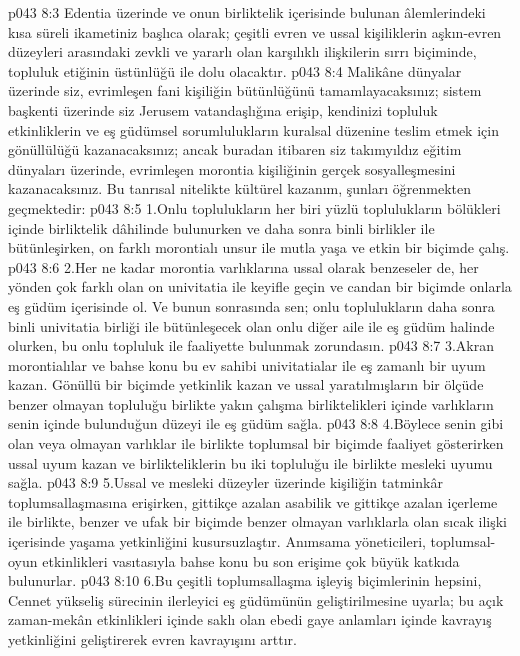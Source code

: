 \vs p043 8:3 Edentia üzerinde ve onun birliktelik içerisinde bulunan âlemlerindeki kısa süreli ikametiniz başlıca olarak; çeşitli evren ve ussal kişiliklerin aşkın\hyp{}evren düzeyleri arasındaki zevkli ve yararlı olan karşılıklı ilişkilerin sırrı biçiminde, topluluk etiğinin üstünlüğü ile dolu olacaktır.
\vs p043 8:4 Malikâne dünyalar üzerinde siz, evrimleşen fani kişiliğin bütünlüğünü tamamlayacaksınız; sistem başkenti üzerinde siz Jerusem vatandaşlığına erişip, kendinizi topluluk etkinliklerin ve eş güdümsel sorumlulukların kuralsal düzenine teslim etmek için gönüllülüğü kazanacaksınız; ancak buradan itibaren siz takımyıldız eğitim dünyaları üzerinde, evrimleşen morontia kişiliğinin gerçek sosyalleşmesini kazanacaksınız. Bu tanrısal nitelikte kültürel kazanım, şunları öğrenmekten geçmektedir:
\vs p043 8:5 1.\bibnobreakspace Onlu toplulukların her biri yüzlü toplulukların bölükleri içinde birliktelik dâhilinde bulunurken ve daha sonra binli birlikler ile bütünleşirken, on farklı morontialı unsur ile mutla yaşa ve etkin bir biçimde çalış.
\vs p043 8:6 2.\bibnobreakspace Her ne kadar morontia varlıklarına ussal olarak benzeseler de, her yönden çok farklı olan on univitatia ile keyifle geçin ve candan bir biçimde onlarla eş güdüm içerisinde ol. Ve bunun sonrasında sen; onlu toplulukların daha sonra binli univitatia birliği ile bütünleşecek olan onlu diğer aile ile eş güdüm halinde olurken, bu onlu topluluk ile faaliyette bulunmak zorundasın.
\vs p043 8:7 3.\bibnobreakspace Akran morontialılar ve bahse konu bu ev sahibi univitatialar ile eş zamanlı bir uyum kazan. Gönüllü bir biçimde yetkinlik kazan ve ussal yaratılmışların bir ölçüde benzer olmayan topluluğu birlikte yakın çalışma birliktelikleri içinde varlıkların senin içinde bulunduğun düzeyi ile eş güdüm sağla.
\vs p043 8:8 4.\bibnobreakspace Böylece senin gibi olan veya olmayan varlıklar ile birlikte toplumsal bir biçimde faaliyet gösterirken ussal uyum kazan ve birlikteliklerin bu iki topluluğu ile birlikte mesleki uyumu sağla.
\vs p043 8:9 5.\bibnobreakspace Ussal ve mesleki düzeyler üzerinde kişiliğin tatminkâr toplumsallaşmasına erişirken, gittikçe azalan asabilik ve gittikçe azalan içerleme ile birlikte, benzer ve ufak bir biçimde benzer olmayan varlıklarla olan sıcak ilişki içerisinde yaşama yetkinliğini kusursuzlaştır. Anımsama yöneticileri, toplumsal\hyp{}oyun etkinlikleri vasıtasıyla bahse konu bu son erişime çok büyük katkıda bulunurlar.
\vs p043 8:10 6.\bibnobreakspace Bu çeşitli toplumsallaşma işleyiş biçimlerinin hepsini, Cennet yükseliş sürecinin ilerleyici eş güdümünün geliştirilmesine uyarla; bu açık zaman\hyp{}mekân etkinlikleri içinde saklı olan ebedi gaye anlamları içinde kavrayış yetkinliğini geliştirerek evren kavrayışını arttır.
